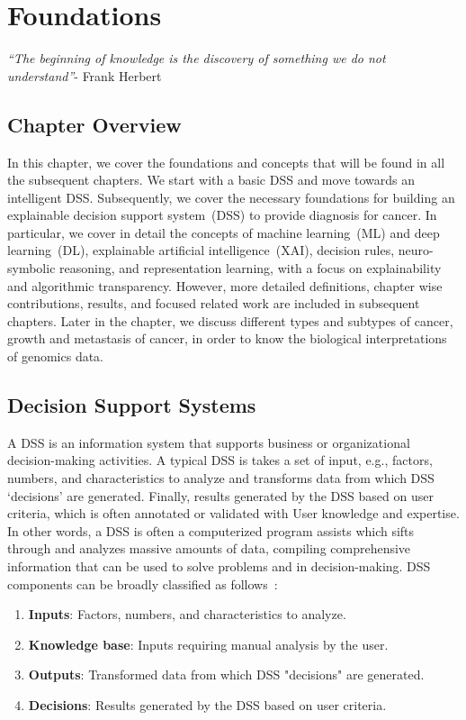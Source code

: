 \chapter{Foundations}
\label{chapter:preli}
\textit{``The beginning of knowledge is the discovery of something we do not understand''}- Frank Herbert 

\section{Chapter Overview}
In this chapter, we cover the foundations and concepts that will be found in all the subsequent chapters. We start with a basic DSS and move towards an intelligent DSS. Subsequently, we cover the necessary foundations for building an explainable decision support system~(DSS) to provide diagnosis for cancer. In particular, we cover in detail the concepts of machine learning~(ML) and deep learning~(DL), explainable artificial intelligence~(XAI), decision rules, neuro-symbolic reasoning, and representation learning, with a focus on explainability and algorithmic transparency. However, more detailed definitions, chapter wise contributions, results, and focused related work are included in subsequent chapters. Later in the chapter, we discuss different types and subtypes of cancer, growth and metastasis of cancer, in order to know the biological interpretations of genomics data. 

\section{Decision Support Systems}\label{sec:DSS}
A DSS is an information system that supports business or organizational decision-making activities. A typical DSS is takes a set of input, e.g., factors, numbers, and characteristics to analyze and transforms data from which DSS `decisions' are generated. Finally, results generated by the DSS based on user criteria, which is often annotated or validated with User knowledge and expertise. In other words, a DSS is  often a computerized program assists which sifts through and analyzes massive amounts of data, compiling comprehensive information that can be used to solve problems and in decision-making. DSS components can be broadly classified as follows~\cite{hackathorn1981organizational}: 

\begin{enumerate}[noitemsep]
    \item  \textbf{Inputs}: Factors, numbers, and characteristics to analyze.
    \item \textbf{Knowledge base}: Inputs requiring manual analysis by the user.
    \item \textbf{Outputs}: Transformed data from which DSS "decisions" are generated.
    \item \textbf{Decisions}: Results generated by the DSS based on user criteria.
\end{enumerate}

